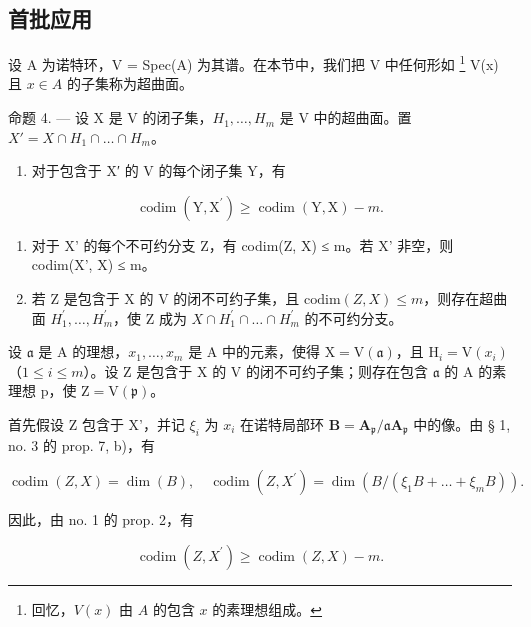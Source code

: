\subsection{首批应用}

设 A 为诺特环，V = Spec(A) 为其谱。在本节中，我们把 V 中任何形如 \footnote{回忆，\(V(x)\) 由 \(A\) 的包含 \(x\) 的素理想组成。} V(x) 且 \(x \in A\) 的子集称为超曲面。

命题 4. --- 设 X 是 V 的闭子集，\(H_{1}, \ldots, H_{m}\) 是 V 中的超曲面。置 \(X' = X \cap H_{1} \cap \ldots \cap H_{m}\)。

\begin{enumerate}
\def\labelenumi{\alph{enumi})}
\tightlist
\item
  对于包含于 X′ 的 V 的每个闭子集 Y，有
\end{enumerate}

\[
\operatorname{codim} (\mathrm{Y}, \mathrm{X} ^ {\prime}) \geqslant \operatorname{codim} (\mathrm{Y}, \mathrm{X}) - m.
\]

\begin{enumerate}
\def\labelenumi{\alph{enumi})}
\setcounter{enumi}{1}
\item
  对于 X' 的每个不可约分支 Z，有 codim(Z, X) ≤ m。若 X' 非空，则 codim(X', X) ≤ m。
\item
  若 Z 是包含于 X 的 V 的闭不可约子集，且 \(\text{codim}(Z, X) \leqslant m\)，则存在超曲面 \(H_{1}^{\prime}, \ldots, H_{m}^{\prime}\)，使 Z 成为 \(X \cap H_{1}^{\prime} \cap \ldots \cap H_{m}^{\prime}\) 的不可约分支。
\end{enumerate}

设 \(\mathfrak{a}\) 是 A 的理想，\(x_{1},\ldots,x_{m}\) 是 A 中的元素，使得 \(\mathrm{X}=\mathrm{V}(\mathfrak{a})\)，且 \(\mathrm{H}_{i}=\mathrm{V}(x_{i})\)（\(1\leqslant i\leqslant m\)）。设 Z 是包含于 X 的 V 的闭不可约子集；则存在包含 \(\mathfrak{a}\) 的 A 的素理想 p，使 \(\mathrm{Z}=\mathrm{V}(\mathfrak{p})\)。

首先假设 Z 包含于 X'，并记 \(\xi_{i}\) 为 \(x_{i}\) 在诺特局部环 \(\mathbf{B} = \mathbf{A}_{\mathfrak{p}} / \mathfrak{a}\mathbf{A}_{\mathfrak{p}}\) 中的像。由 § 1, no. 3 的 prop. 7, b)，有

\[
\operatorname{codim} (Z, X) = \dim (B), \quad \operatorname{codim} (Z, X ^ {\prime}) = \dim (B / (\xi_ {1} B + \dots + \xi_ {m} B)).
\]

因此，由 no. 1 的 prop. 2，有

\[
\operatorname{codim} (Z, X ^ {\prime}) \geqslant \operatorname{codim} (Z, X) - m.\tag{11}
\]


